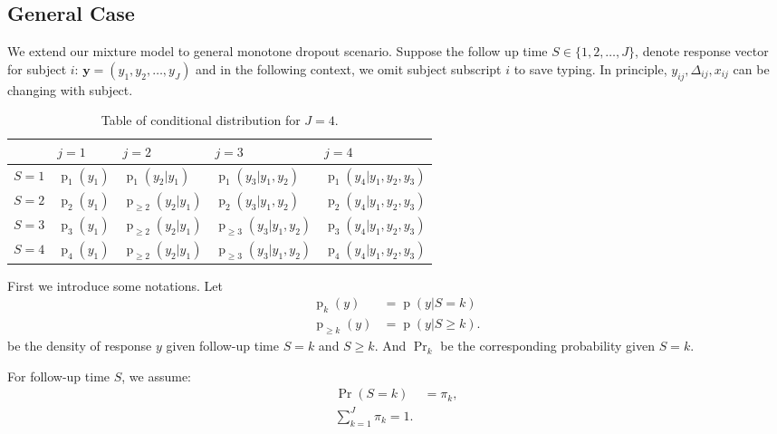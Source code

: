 \documentclass[12pt]{article}
\DeclareMathOperator{\pr}{p}
\DeclareMathOperator{\prob}{Pr}
\begin{document}
\subsection{General Case}
\label{sec:general-case}

We extend our mixture model to general monotone dropout
scenario. Suppose the follow up time $S \in \{1, 2, \ldots, J\}$,
denote response vector for subject $i$: $\bm y = (y_{1}, y_2, \ldots,
y_J)$ and in the following context, we omit subject subscript $i$ to
save typing. In principle, $y_{ij}, \Delta_{ij}, x_{ij}$ can be changing
with subject.

\begin{table}[h]
  \renewcommand{\arraystretch}{1.3}
  \centering
  \caption[]{\label{tab:mar} Table of conditional distribution for $J = 4$. }
  \vspace{4mm}
  \begin{tabular}[tb]{lllll}
    \toprule
    & $j = 1$    & $j=2$         & $j=3$            & $j=4$                 \\
    \hline
    $S=1$ & $\pr_1(y_1)$ & $\pr_1(y_2|y_1)$ & $\pr_1(y_3|y_1,y_2)$ & $\pr_1(y_4|y_1, y_2, y_3)$ \\
    \cline{3-3}
    $S=2$ & $\pr_2(y_1)$ & $\pr_{\geq 2}(y_2|y_1)$ & $\pr_2(y_3|y_1,y_2)$ & $\pr_2(y_4|y_1, y_2, y_3)$ \\
    \cline{4-4}
    $S=3$ & $\pr_3(y_1)$ & $\pr_{\geq 2}(y_2|y_1)$  & $\pr_{\geq 3}(y_3|y_1,y_2)$ & $\pr_3(y_4|y_1, y_2, y_3)$ \\
    \cline{5-5}
    $S=4$ & $\pr_4(y_1)$ & $\pr_{\geq 2}(y_2|y_1)$ & $\pr_{\geq 3}(y_3|y_1,y_2)$ & $\pr_4(y_4|y_1, y_2, y_3)$ \\
    \bottomrule
  \end{tabular}
\end{table}

First we introduce some notations. Let
\begin{align*}
  \pr_k(y) &= \pr (y | S = k)\\
  \pr_{\geq k} (y) & = \pr (y | S \geq k).
\end{align*}
be the density of response $y$ given follow-up time $S=k$ and $S \geq
k$. And $\prob_k$ be the corresponding probability given $S = k$.

For follow-up time $S$, we assume:
\begin{align*}
  \prob (S = k) & = \pi_k,\\
  \sum_{k=1}^J \pi_k = 1.
\end{align*}
\end{document}
